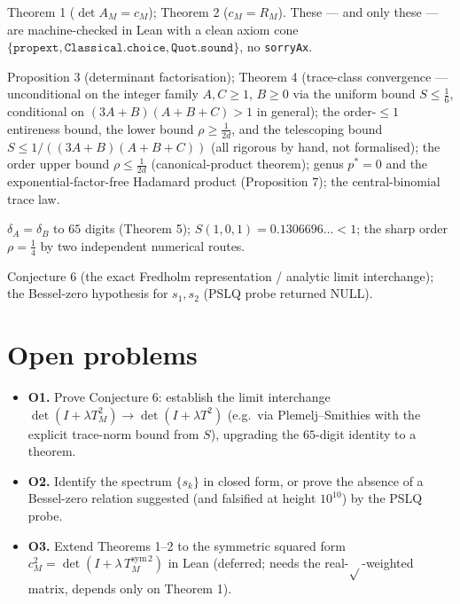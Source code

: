 \documentclass[
]{article}
\providecommand{\tightlist}{%
  \setlength{\itemsep}{0pt}\setlength{\parskip}{0pt}}
\theoremstyle{plain}
\theoremstyle{remark}
\providecommand{\tightlist}{%
  \setlength{\itemsep}{0pt}\setlength{\parskip}{0pt}}
\begin{document}
\begin{description}
\tightlist
\item[PROVEN]
Theorem 1 (\(\det A_M=c_M\)); Theorem 2 (\(c_M=R_M\)). These --- and
only these --- are machine-checked in Lean with a clean axiom cone
\(\{\texttt{propext},\texttt{Classical.choice},\texttt{Quot.sound}\}\),
no \texttt{sorryAx}.
\item[STRUCTURAL]
Proposition 3 (determinant factorisation); Theorem 4 (trace-class
convergence --- unconditional on the integer family \(A,C\ge1\),
\(B\ge0\) via the uniform bound \(S\le\tfrac16\), conditional on
\((3A+B)(A+B+C)>1\) in general); the order-\(\le 1\) entireness bound,
the lower bound \(\rho\ge\tfrac1{2d}\), and the telescoping bound
\(S\le 1/((3A+B)(A+B+C))\) (all rigorous by hand, not formalised); the
order upper bound \(\rho\le\tfrac1{2d}\) (canonical-product theorem);
genus \(p^{*}=0\) and the exponential-factor-free Hadamard product
(Proposition 7); the central-binomial trace law.
\item[VERIFIED]
\(\delta_A=\delta_B\) to \(65\) digits (Theorem 5);
\(S(1,0,1)=0.1306696\ldots<1\); the sharp order \(\rho=\tfrac14\) by two
independent numerical routes.
\item[CONJECTURED]
Conjecture 6 (the exact Fredholm representation / analytic limit
interchange); the Bessel-zero hypothesis for \(s_1,s_2\) (PSLQ probe
returned NULL).
\end{description}

\section{Open problems}\label{open-problems}

\begin{itemize}
\tightlist
\item
  \textbf{O1.} Prove Conjecture 6: establish the limit interchange
  \(\det(I+\lambda T_M^2)\to\det(I+\lambda T^2)\) (e.g.~via
  Plemelj--Smithies with the explicit trace-norm bound from \(S\)),
  upgrading the \(65\)-digit identity to a theorem.
\item
  \textbf{O2.} Identify the spectrum \(\{s_k\}\) in closed form, or
  prove the absence of a Bessel-zero relation suggested (and falsified
  at height \(10^{10}\)) by the PSLQ probe.
\item
  \textbf{O3.} Extend Theorems 1--2 to the symmetric squared form
  \(c_M^2=\det(I+\lambda\,T^{\mathrm{sym}\,2}_M)\) in Lean (deferred;
  needs the real-\(\sqrt{}\)-weighted matrix, depends only on Theorem
  1).
\end{itemize}
\end{document}
